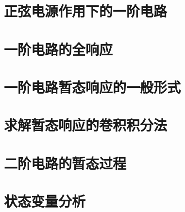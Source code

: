 \section{正弦电源作用下的一阶电路}

\section{一阶电路的全响应}

\section{一阶电路暂态响应的一般形式}

\section{求解暂态响应的卷积积分法}

\section{二阶电路的暂态过程}

\section{状态变量分析}